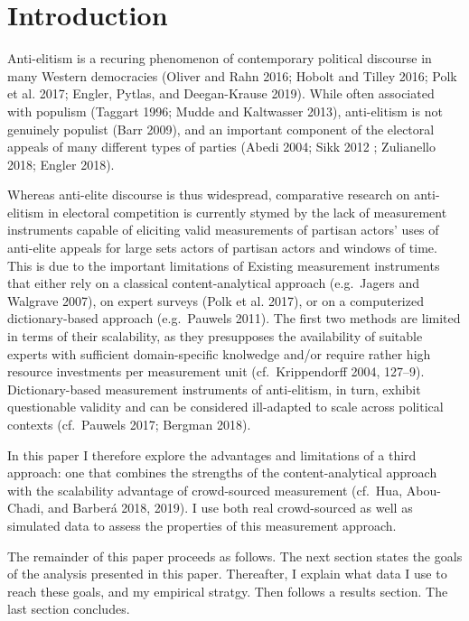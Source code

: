 \documentclass[12pt,]{article}
\begin{document}
\vskip 6.5pt


\noindent \onehalfspacing \hypertarget{introduction}{%
\section{Introduction}\label{introduction}}

Anti-elitism is a recuring phenomenon of contemporary political
discourse in many Western democracies (Oliver and Rahn 2016; Hobolt and
Tilley 2016; Polk et al. 2017; Engler, Pytlas, and Deegan-Krause 2019).
While often associated with populism (Taggart 1996; Mudde and Kaltwasser
2013), anti-elitism is not genuinely populist (Barr 2009), and an
important component of the electoral appeals of many different types of
parties (Abedi 2004; Sikk 2012 ; Zulianello 2018; Engler 2018).

Whereas anti-elite discourse is thus widespread, comparative research on
anti-elitism in electoral competition is currently stymed by the lack of
measurement instruments capable of eliciting valid measurements of
partisan actors' uses of anti-elite appeals for large sets actors of
partisan actors and windows of time. This is due to the important
limitations of Existing measurement instruments that either rely on a
classical content-analytical approach (e.g.~Jagers and Walgrave 2007),
on expert surveys (Polk et al. 2017), or on a computerized
dictionary-based approach (e.g.~Pauwels 2011). The first two methods are
limited in terms of their scalability, as they presupposes the
availability of suitable experts with sufficient domain-specific
knolwedge and/or require rather high resource investments per
measurement unit (cf.~Krippendorff 2004, 127--9). Dictionary-based
measurement instruments of anti-elitism, in turn, exhibit questionable
validity and can be considered ill-adapted to scale across political
contexts (cf.~Pauwels 2017; Bergman 2018).

In this paper I therefore explore the advantages and limitations of a
third approach: one that combines the strengths of the
content-analytical approach with the scalability advantage of
crowd-sourced measurement (cf.~Hua, Abou-Chadi, and Barberá 2018, 2019).
I use both real crowd-sourced as well as simulated data to assess the
properties of this measurement approach.

The remainder of this paper proceeds as follows. The next section states
the goals of the analysis presented in this paper. Thereafter, I explain
what data I use to reach these goals, and my empirical stratgy. Then
follows a results section. The last section concludes.
\end{document}
